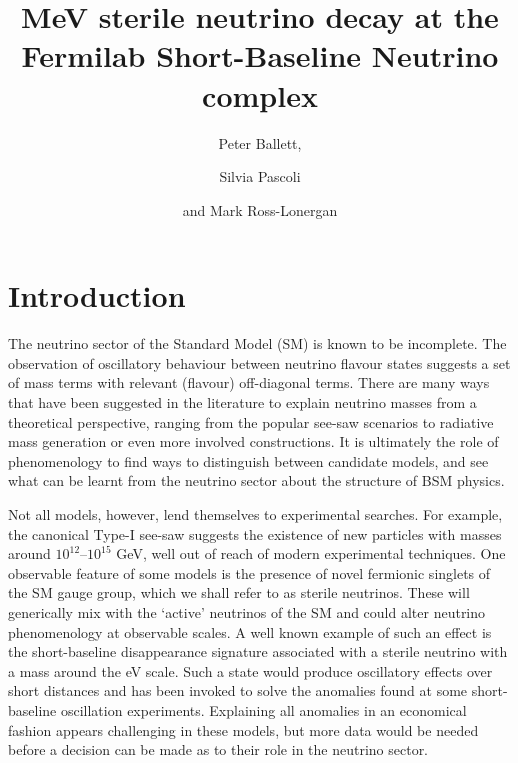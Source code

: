 \documentclass[11pt, a4paper]{article}
\title{MeV sterile neutrino decay at the Fermilab Short-Baseline Neutrino complex}
\author{Peter Ballett,}
\author{Silvia Pascoli}
\author{and Mark Ross-Lonergan}
\affiliation{Institute for Particle Physics Phenomenology, Department of
Physics, Durham University, South Road, Durham DH1 3LE, United Kingdom}
\begin{document}
 

\maketitle

\section{Introduction}

The neutrino sector of the Standard Model (SM) is known to be incomplete. The
observation of oscillatory behaviour between neutrino flavour states suggests a
set of mass terms with relevant (flavour) off-diagonal terms. There are many
ways that have been suggested in the literature to explain neutrino masses from
a theoretical perspective, ranging from the popular see-saw scenarios to
radiative mass generation or even more involved constructions. It is ultimately
the role of phenomenology to find ways to distinguish between candidate models,
and see what can be learnt from the neutrino sector about the structure of BSM
physics.

Not all models, however, lend themselves to experimental searches. For example,
the canonical Type-I see-saw \cite{Minkowski:1977sc, GellMann:1980vs,
Mohapatra:1979ia} suggests the existence of new particles with masses around
$10^{12}$--$10^{15}$ GeV, well out of reach of modern experimental techniques. One
observable feature of some models is the presence of novel fermionic singlets
of the SM gauge group, which we shall refer to as sterile neutrinos. These will
generically mix with the `active' neutrinos of the SM and could alter neutrino
phenomenology at observable scales. 
%
A well known example of such an effect is the short-baseline disappearance
signature associated with a sterile neutrino with a mass around the eV scale. Such a state
would produce oscillatory effects over short distances and has been invoked to
solve the anomalies found at some short-baseline oscillation experiments.
Explaining all anomalies in an economical fashion appears challenging in these
models, but more data would be needed before a decision can be made as to their
role in the neutrino sector.
\end{document}

